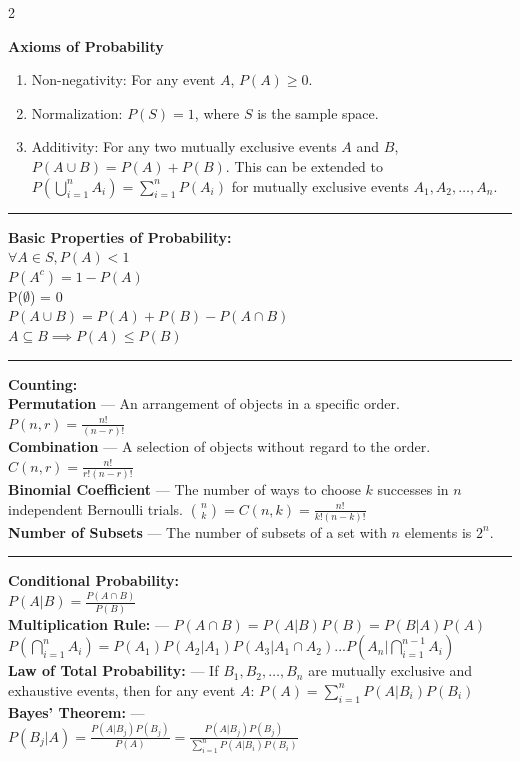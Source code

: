 \documentclass[10pt,letterpaper]{article}
\begin{document}
\begin{multicols}{2}

\textbf{Axioms of Probability}
\begin{enumerate}
    \item Non-negativity: For any event \( A \), \( P(A) \geq 0 \).
    \item Normalization: \( P(S) = 1 \), where \( S \) is the sample space.
    \item Additivity: For any two mutually exclusive events \( A \) and \( B \), \( P(A \cup B) = P(A) + P(B) \).
    This can be extended to $P(\bigcup_{i=1}^n A_i) = \sum_{i=1}^n P(A_i)$ for mutually exclusive events \( A_1, A_2, \ldots, A_n \).
\end{enumerate}

\vspace{0.1cm}
\hrule
\vspace{0.1cm}

\textbf{Basic Properties of Probability:}\\
$\forall A \in S, P(A) < 1$\\
$P(A^c) = 1 - P(A)$\\
P($\emptyset$) = 0\\
$P(A \cup B) = P(A) + P(B) - P(A \cap B)$\\
$A \subseteq B \implies P(A) \leq P(B)$

\vspace{0.1cm}
\hrule
\vspace{0.1cm}

\textbf{Counting:}\\
\textbf{Permutation} --- An arrangement of objects in a specific order. $P(n, r) = \frac{n!}{(n-r)!}$\\
\textbf{Combination} --- A selection of objects without regard to the order. $C(n, r) = \frac{n!}{r!(n-r)!}$\\
\textbf{Binomial Coefficient} --- The number of ways to choose \( k \) successes in \( n \) independent Bernoulli trials. 
$\binom{n}{k} = C(n, k) = \frac{n!}{k!(n-k)!}$\\
\textbf{Number of Subsets} --- The number of subsets of a set with \( n \) elements is \( 2^n \).

\vspace{0.1cm}
\hrule
\vspace{0.1cm}

\textbf{Conditional Probability:}\\
$P(A|B) = \frac{P(A \cap B)}{P(B)}$\\
\textbf{Multiplication Rule:} --- $P(A \cap B) = P(A|B)P(B) = P(B|A)P(A)$\\
$P(\bigcap_{i=1}^n A_i) = P(A_1)P(A_2|A_1)P(A_3|A_1 \cap A_2)...P(A_n|\bigcap_{i=1}^{n-1} A_i)$\\
\textbf{Law of Total Probability:} --- If \( B_1, B_2, \ldots, B_n \) are mutually exclusive and exhaustive events, then for any event \( A \):
$P(A) = \sum_{i=1}^n P(A|B_i)P(B_i)$\\
\textbf{Bayes' Theorem:} --- \\
$P(B_j|A) = \frac{P(A|B_j)P(B_j)}{P(A)} = \frac{P(A|B_j)P(B_j)}{\sum_{i=1}^n P(A|B_i)P(B_i)}$


\end{multicols}
\end{document}
